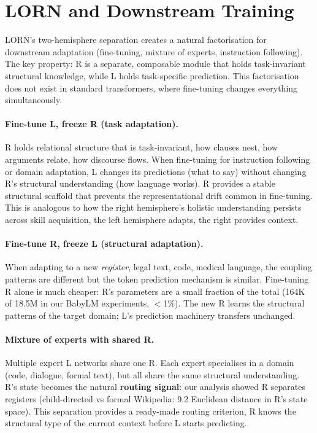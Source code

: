 \documentclass[11pt, a4paper]{article}
\theoremstyle{plain}
\theoremstyle{definition}
\theoremstyle{remark}
\begin{document}
\appendix

\section{LORN and Downstream Training}
\label{app:downstream}

LORN's two-hemisphere separation creates a natural factorisation for downstream adaptation (fine-tuning, mixture of experts, instruction following).
The key property: R is a separate, composable module that holds task-invariant structural knowledge, while L holds task-specific prediction.
This factorisation does not exist in standard transformers, where fine-tuning changes everything simultaneously.

\paragraph{Fine-tune L, freeze R (task adaptation).}
R holds relational structure that is task-invariant, how clauses nest, how arguments relate, how discourse flows.
When fine-tuning for instruction following or domain adaptation, L changes its predictions (what to say) without changing R's structural understanding (how language works).
R provides a stable structural scaffold that prevents the representational drift common in fine-tuning.
This is analogous to how the right hemisphere's holistic understanding persists across skill acquisition, the left hemisphere adapts, the right provides context.

\paragraph{Fine-tune R, freeze L (structural adaptation).}
When adapting to a new \emph{register}, legal text, code, medical language, the coupling patterns are different but the token prediction mechanism is similar.
Fine-tuning R alone is much cheaper: R's parameters are a small fraction of the total (164K of 18.5M in our BabyLM experiments, $<$1\%).
The new R learns the structural patterns of the target domain; L's prediction machinery transfers unchanged.

\paragraph{Mixture of experts with shared R.}
Multiple expert L networks share one R.
Each expert specialises in a domain (code, dialogue, formal text), but all share the same structural understanding.
R's state becomes the natural \textbf{routing signal}: our analysis showed R separates registers (child-directed vs formal Wikipedia: 9.2 Euclidean distance in R's state space).
This separation provides a ready-made routing criterion, R knows the structural type of the current context before L starts predicting.
\end{document}
